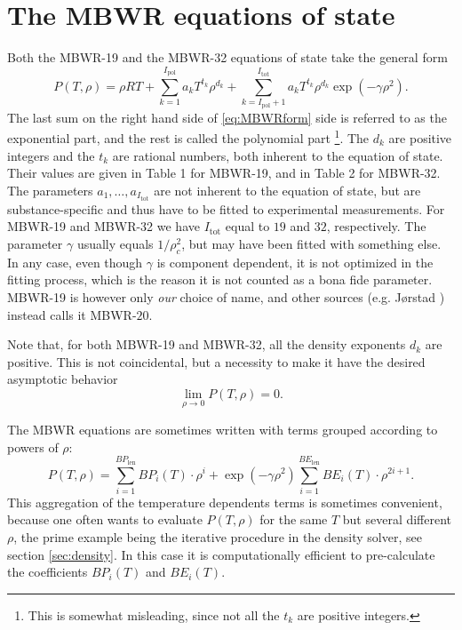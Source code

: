 \documentclass[english]{../thermomemo/thermomemo}
\newcommand{\lp}{\left(}
\newcommand{\rp}{\right)}
\numberwithin{equation}{section}
\begin{document}
\section{The MBWR equations of state}
Both the MBWR-19 and the MBWR-32 equations of state take the general
form
\begin{equation}
  \label{eq:MBWRform}
  P(T,\rho) = \rho R T + \sum_{k=1}^{I_{\mathrm{pol}}} a_k T^{t_k} \rho^{d_k} +\sum_{k=I_{\mathrm{pol}}+1}^{I_{\mathrm{tot}}} a_k T^{t_k} \rho^{d_k} \exp \lp -\gamma \rho^2 \rp.
\end{equation}
The last sum on the right hand side of \eqref{eq:MBWRform} side is referred
to as the exponential part, and the rest is called the polynomial
part%
\footnote{This is somewhat misleading, since not all the $t_k$ are
  positive integers.}. %
The $d_k$ are positive integers and the $t_k$ are rational numbers,
both inherent to the equation of state. Their values are given in
Table 1 for MBWR-19, and in Table 2
for MBWR-32. The parameters $a_1,\ldots,a_{I_{\mathrm{tot}}}$ are not
inherent to the equation of state, but are substance-specific and thus have to be fitted to experimental measurements. For MBWR-19 and MBWR-32 we have
$I_{\mathrm{tot}}$ equal to $19$ and $32$, respectively. The
parameter $\gamma$ usually equals $1/\rho_{c}^2$, but may have been
fitted with something else. In any case, even though $\gamma$ is
component dependent, it is not optimized in the fitting process, which
is the reason it is not counted as a bona fide parameter. MBWR-19 is
however only \textit{our} choice of name, and other sources (e.g.
J{\o}rstad \cite{Jorstad93}) instead calls it MBWR-$20$.

Note that, for both MBWR-19 and MBWR-32, all the density exponents $d_k$ are positive. This is not coincidental, but a necessity to make it have the desired asymptotic behavior
$$
\lim_{\rho \to 0} P(T,\rho) = 0.
$$

The MBWR equations are sometimes written with terms grouped according
to powers of $\rho$:
\begin{equation}
  \label{eq:bpbeform}
  P(T,\rho) = \sum_{i=1}^{BP_\text{len}}BP_i(T) \cdot \rho^i
  + \exp(-\gamma \rho^2) \sum_{i=1}^{BE_\text{len}} BE_i(T) \cdot \rho^{2i+1}.
\end{equation}
This aggregation of the temperature dependents terms is sometimes
convenient, because one often wants to evaluate $P(T,\rho)$ for the same $T$
but several different $\rho$, the prime example being the iterative procedure in the density
solver, see section \ref{sec:density}. In this case it is
computationally efficient to pre-calculate the coefficients $BP_i(T)$
and $BE_i(T)$.
\end{document}
